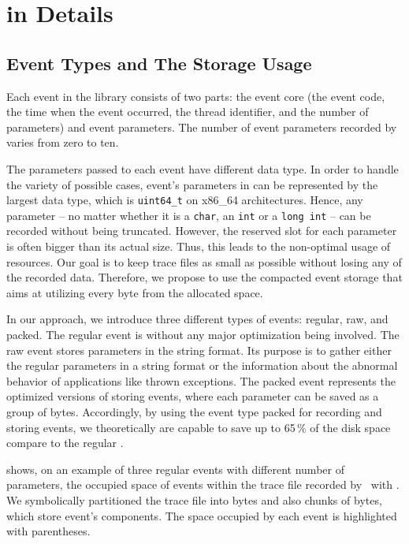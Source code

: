 \chapter{\litl{} in Details}
\section{Event Types and The Storage Usage}
Each event in the \litl{} library consists of two parts: the event core (the 
event code, the time when the event occurred, the thread identifier, and the 
number of parameters) and event parameters. The number of event parameters 
recorded by \litl{} varies from zero to ten. 

The parameters passed to each event have different data type. In order to handle
the variety of possible cases, event's parameters in \litl{} can be represented 
by the largest data type, which is \texttt{uint64\_t} on x86\_64 architectures.
Hence, any parameter -- no matter whether it is a \texttt{char}, an 
\texttt{int} or a \texttt{long int} -- can be recorded without being truncated. 
However, the reserved slot for each parameter is often bigger than its actual 
size. Thus, this leads to the non-optimal usage of resources.
Our goal is to keep trace files as small as possible without 
losing any of the recorded data. Therefore, we propose to use the compacted 
event storage that aims at utilizing every byte from the allocated space.

In our approach, we introduce three different types of events: regular, raw, and
packed. The regular event is without any major optimization being involved. 
The raw event stores parameters in the string format. Its purpose is to gather 
either the regular parameters in a string format or the information about the 
abnormal behavior of applications like thrown exceptions.
The packed event represents the optimized versions of storing events, where 
each parameter can be saved as a group of bytes. Accordingly, by using the 
event type packed for recording and storing events, we theoretically are 
capable to save up to 65\,\% of the disk space compare to the regular \litl{}.

 shows, on an example of three regular events with 
different number of parameters, the occupied space of events within the trace 
file recorded by \eztrace\ with \litl{}. We symbolically partitioned the trace 
file into bytes and also chunks of bytes, which store event's components. The 
space occupied by each event is highlighted with parentheses.

